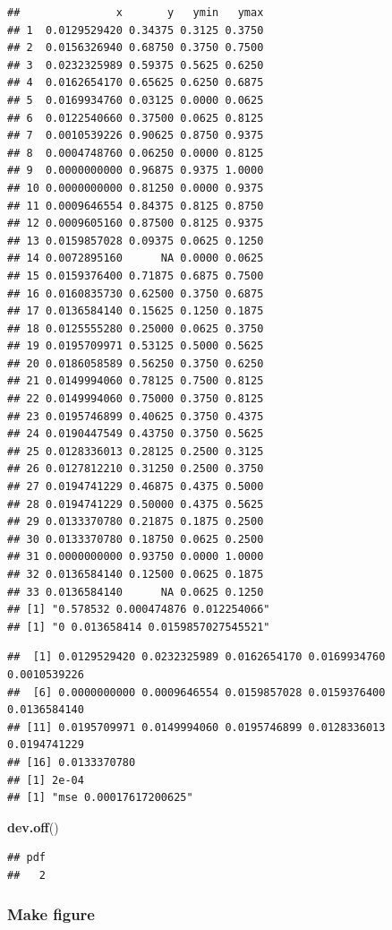 \documentclass[]{article}
\newenvironment{Shaded}{\begin{snugshade}}{\end{snugshade}}
\newcommand{\KeywordTok}[1]{\textcolor[rgb]{0.13,0.29,0.53}{\textbf{#1}}}
\newcommand{\NormalTok}[1]{#1}
\begin{document}
\begin{verbatim}
##               x       y   ymin   ymax
## 1  0.0129529420 0.34375 0.3125 0.3750
## 2  0.0156326940 0.68750 0.3750 0.7500
## 3  0.0232325989 0.59375 0.5625 0.6250
## 4  0.0162654170 0.65625 0.6250 0.6875
## 5  0.0169934760 0.03125 0.0000 0.0625
## 6  0.0122540660 0.37500 0.0625 0.8125
## 7  0.0010539226 0.90625 0.8750 0.9375
## 8  0.0004748760 0.06250 0.0000 0.8125
## 9  0.0000000000 0.96875 0.9375 1.0000
## 10 0.0000000000 0.81250 0.0000 0.9375
## 11 0.0009646554 0.84375 0.8125 0.8750
## 12 0.0009605160 0.87500 0.8125 0.9375
## 13 0.0159857028 0.09375 0.0625 0.1250
## 14 0.0072895160      NA 0.0000 0.0625
## 15 0.0159376400 0.71875 0.6875 0.7500
## 16 0.0160835730 0.62500 0.3750 0.6875
## 17 0.0136584140 0.15625 0.1250 0.1875
## 18 0.0125555280 0.25000 0.0625 0.3750
## 19 0.0195709971 0.53125 0.5000 0.5625
## 20 0.0186058589 0.56250 0.3750 0.6250
## 21 0.0149994060 0.78125 0.7500 0.8125
## 22 0.0149994060 0.75000 0.3750 0.8125
## 23 0.0195746899 0.40625 0.3750 0.4375
## 24 0.0190447549 0.43750 0.3750 0.5625
## 25 0.0128336013 0.28125 0.2500 0.3125
## 26 0.0127812210 0.31250 0.2500 0.3750
## 27 0.0194741229 0.46875 0.4375 0.5000
## 28 0.0194741229 0.50000 0.4375 0.5625
## 29 0.0133370780 0.21875 0.1875 0.2500
## 30 0.0133370780 0.18750 0.0625 0.2500
## 31 0.0000000000 0.93750 0.0000 1.0000
## 32 0.0136584140 0.12500 0.0625 0.1875
## 33 0.0136584140      NA 0.0625 0.1250
## [1] "0.578532 0.000474876 0.012254066"
## [1] "0 0.013658414 0.0159857027545521"
\end{verbatim}

\begin{verbatim}
##  [1] 0.0129529420 0.0232325989 0.0162654170 0.0169934760 0.0010539226
##  [6] 0.0000000000 0.0009646554 0.0159857028 0.0159376400 0.0136584140
## [11] 0.0195709971 0.0149994060 0.0195746899 0.0128336013 0.0194741229
## [16] 0.0133370780
## [1] 2e-04
## [1] "mse 0.00017617200625"
\end{verbatim}

\begin{Shaded}
\begin{Highlighting}[]
\KeywordTok{dev.off}\NormalTok{()}
\end{Highlighting}
\end{Shaded}

\begin{verbatim}
## pdf 
##   2
\end{verbatim}

\subsubsection{Make figure}\label{make-figure}
\end{document}

